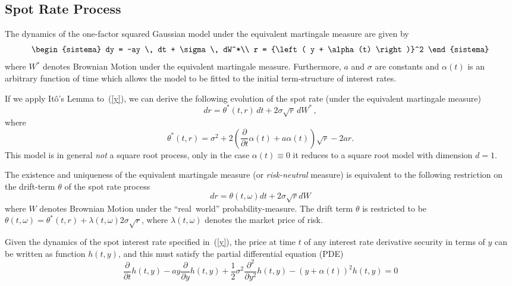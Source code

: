 \subsection{Spot Rate Process}
The dynamics of the one-factor squared Gaussian model under the equivalent martingale measure are given by
\begin{equation}
\label{y}
\begin{sistema}
dy = -ay \, dt + \sigma \, dW^*\\
r = {\left( y + \alpha(t) \right)}^2
\end{sistema}
\end{equation}
where $W^*$ denotes Brownian Motion under the equivalent martingale measure. Furthermore, $a$ and $\sigma$ are constants and $\alpha(t)$ is an arbitrary function of time which allows the model to be fitted to the initial term-structure of interest rates.

If we apply It\^o's Lemma to~(\ref{y}), we can derive the following evolution of the spot rate (under the equivalent martingale measure)
\begin{equation}
dr = \theta^{*}(t,r) \, dt + 2 \sigma \sqrt{r} \, dW^{*} \, ,
\end{equation}
where
\begin{equation}
\theta^{*}(t,r) = \sigma^2 +2 \left(\frac{\partial}{\partial t}\alpha(t) + a \alpha(t) \right)\sqrt{r} - 2 a r.
\end{equation}
This model is in general \emph{not} a square root process, only in the case $\alpha(t)\equiv0$ it reduces to a square root model with dimension $d=1$.


The existence and uniqueness of the equivalent martingale measure (or \emph{risk-neutral} measure) is equivalent to the following restriction on the drift-term $\theta$ of the spot rate process
\begin{equation}
 dr=\theta(t,\omega)dt+2\sigma \sqrt{r} dW
\end{equation}
where $W$ denotes Brownian Motion under the ``real~world'' probability-measure. The drift term $\theta$ is restricted to be $\theta(t,\omega) = \theta^*(t,r)+\lambda(t,\omega)2\sigma\sqrt{r}$, where $\lambda(t,\omega)$ denotes the market price of risk.

Given the dynamics of the spot interest rate specified in~(\ref{y}), the price at time $t$ of any interest rate derivative security in terms of $y$ can be written as function $h(t,y)$, and this must satisfy the partial differential equation (PDE)
\begin{equation}
\label{pde}
\frac{\partial}{\partial t}h(t,y) - ay\frac{\partial}{\partial y}h(t,y) + \frac{1}{2}\sigma^2\frac{\partial^2}{\partial y^2}h(t,y)
- {\left( y+\alpha(t)\right)}^2 h(t,y) = 0
\end{equation}


